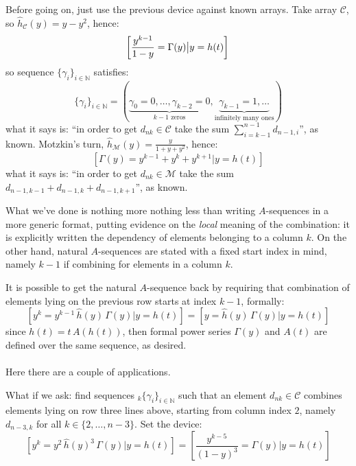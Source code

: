 \documentclass[11pt,a4paper]{article} %
\begin{document}
    Before going on, just use the previous device against known arrays. Take 
    array $\mathcal{C}$, so $\hat{h}_{\mathcal{C}}(y) = y-y^2$, hence:
    \begin{displaymath}
        \left[\frac{y^{k-1}}{1-y} =  \Gamma(y) \big| y = h(t) \right]\\
    \end{displaymath}
    so sequence $\lbrace \gamma_{i} \rbrace_{i\in\mathbb{N}}$ satisfies:
    \begin{displaymath}
        \lbrace \gamma_{i} \rbrace_{i\in\mathbb{N}} = 
            \left(\underbrace{\gamma_{0}=0,\ldots,\gamma_{k-2}=0}_{k-1 \text{ zeros}},
                \underbrace{\gamma_{k-1}=1, \ldots}_{\text{infinitely many ones}} \right)
    \end{displaymath}
    what it says is: ``in order to get $d_{nk}\in\mathcal{C}$ take the sum 
    $\sum_{i=k-1}^{n-1}{d_{n-1,i}}$'', as known. Motzkin's turn, 
    $\hat{h}_{\mathcal{M}}(y) = \frac{y}{1+y+y^2}$, hence:
    \begin{displaymath}
            \left[\Gamma(y)=y^{k-1}+y^{k}+y^{k+1}\big| y = h(t) \right]
    \end{displaymath}
    what it says is: ``in order to get $d_{nk}\in\mathcal{M}$ take the sum 
    $d_{n-1,k-1}+d_{n-1,k}+d_{n-1,k+1}$'', as known.
    
    What we've done is nothing more nothing less than writing $A$-sequences 
    in a more generic format, putting evidence on the \emph{local} meaning 
    of the combination: it is explicitly written the dependency of 
    elements belonging to a column $k$. On the other hand, natural $A$-sequences 
    are stated with a fixed start index in mind, namely $k-1$ if combining 
    for elements in a column $k$.

    It is possible to get the natural $A$-sequence back by requiring that 
    combination of elements lying on the previous row starts at index $k-1$, formally:
    \begin{displaymath}
        \left[y^{k} = y^{k-1}\,\hat{h}(y)\,\Gamma(y) \big| y = h(t) \right] = 
        \left[y = \hat{h}(y)\,\Gamma(y) \big| y = h(t) \right]
    \end{displaymath}
    since $h(t) = t\,A(h(t))$, then formal power series 
    $\Gamma(y)$ and $A(t)$ are defined over the same sequence, as desired.
    \\\\
    Here there are a couple of applications. 

    What if we ask: find sequences $_{k}\lbrace \gamma_{i} \rbrace_{i\in\mathbb{N}}$ 
    such that an element $d_{nk}\in\mathcal{C}$ combines elements lying on 
    row three lines above, starting from column index $2$, 
    namely $d_{n-3,k}$ for all $k\in\lbrace 2,\ldots,n-3\rbrace$. 
    Set the device:
    \begin{displaymath}
        \left[y^{k} = y^{2}\,\hat{h}(y)^3\,\Gamma(y) \big| y = h(t) \right] =
            \left[\frac{y^{k-5}}{(1-y)^3} = \Gamma(y) \big| y = h(t) \right]
    \end{displaymath}
\end{document}
